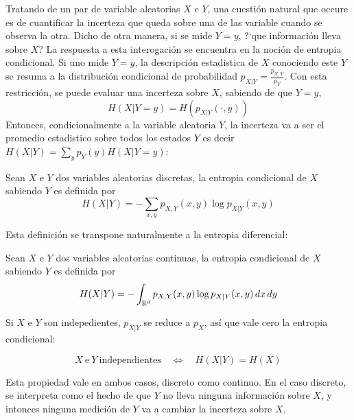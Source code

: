 \label{s:SZ:Mutua}

Tratando de un par de variable  aleatorias $X$ e $Y$, una cuesti\'on natural que
occure es de cuantificar la incerteza que queda sobre una de las variable cuando
se  observa  la  otra.  Dicho  de  otra  manera, si  se  mide  $Y  =  y$,  ?`que
informaci\'on lleva sobre  $X$? La respuesta a esta  interogaci\'on se encuentra
en la  noci\'on de entropia condicional. Si  uno mide $Y =  y$, la descripci\'on
estadistica de $X$ conociendo este $Y$ se resuma a la distribuci\'on condicional
de  probabilidad $p_{X|Y}  = \frac{p_{X,Y}}{p_Y}$.   Con esta  restricci\'on, se
puede  evaluar una  incerteza sobre  $X$, sabiendo  de que  $Y=y$,
%
\[
H(X|Y=y) = H\left( p_{X|Y}(\cdot,y) \right)
\]
%
Entonces, condicionalmente a la variable aleatoria $Y$, la incerteza va a ser el
promedio  estadistico sobre  todos los  estados $Y$  es decir  $H(X|Y)  = \sum_y
p_Y(y) H(X|Y=y)$:
%
\begin{definicion}\label{def:SZ:entropiacondicional}
  Sean $X$ e $Y$ dos  variables aleatorias discretas, la entropia condicional de
  $X$ sabiendo  $Y$ es  definida por
  \[
  H(X|Y) = - \sum_{x,y} p_{X,Y}(x,y) \log p_{X|Y}(x,y)
  \]
\end{definicion}
%
Esta definici\'on se transpone naturalmente a la entropia diferencial:
%
\begin{definicion}\label{def:SZ:entropiadiferencialcondicional}
  Sean $X$ e $Y$ dos  variables aleatorias continuas, la entropia condicional de
  $X$ sabiendo $Y$ es definida por
  \[
  H(X|Y) = - \int_{\mathbb{R}^d} p_{X,Y}(x,y) \log p_{X|Y}(x,y) \, dx \, dy
  \]
\end{definicion}

Si $X$ e $Y$ son indepedientes, $p_{X|Y}$ se reduce a $p_X$, as\'i que vale cero
la entropia condicional:
%
\begin{propiedades}
\item\label{prop:SZ:independenciacondicional}
  \[
  X \: \mbox{e} \: Y \: \mbox{independientes} \quad \Leftrightarrow \quad H(X|Y)
  = H(X)
  \]
\end{propiedades}
%
Esta  propiedad  vale  en ambos  casos,  discreto  como  continuo.  En  el  caso
discreto, se interpreta como el hecho  de que $Y$ no lleva ninguna informaci\'on
sobre $X$, y intonces ninguna medici\'on  de $Y$ va a cambiar la incerteza sobre
$X$.

